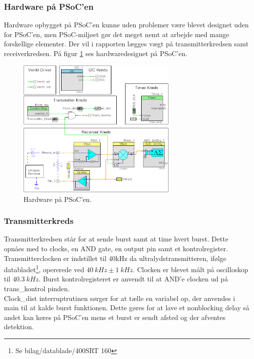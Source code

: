\subsubsection{Hardware på PSoC'en}
Hardware opbygget på PSoC'en kunne uden problemer være blevet designet uden for PSoC'en, men PSoC-miljøet gør det meget nemt at arbejde med mange forskellige elementer. Der vil i rapporten lægges vægt på transmitterkredsen samt receiverkredsen. På figur \ref{fig:PSOCHW} ses hardwaredesignet på PSoC'en.
\begin{figure}[H]
\centering
\includegraphics[width=0.7\textwidth]{billeder/PSOC_Hardware}
\caption{Hardware på PSoC'en.}
\label{fig:PSOCHW}
\end{figure}
\subsubsection{Transmitterkreds}
Transmitterkredsen står for at sende burst samt at time hvert burst.  Dette opnåes med to clocks, en AND gate, en output pin samt et kontrolregister. Transmitterclocken er indstillet til 40kHz da ultralydstransmitteren, ifølge databladet\footnote{Se bilag/datablade/400SRT 160}, opererede ved $\SI{40}{kHz}\pm\SI{1}{kHz}$. Clocken er blevet målt på oscilloskop til $\SI{40.3}{kHz}$. Burst kontrolregisteret er anvendt til at AND'e clocken ud på trans\_kontrol pinden.\\
Clock\_dist interruptrutinen sørger for at tælle en variabel op, der anvendes i main til at kalde burst funktionen. Dette gøres for at lave et nonblocking delay så andet kan køres på PSoC'en mens et burst er sendt afsted og der afventes detektion.
